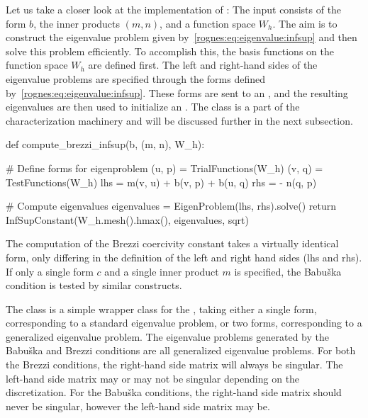 Let us take a closer look at the implementation of
: The input consists of the
form $b$, the inner products $(m, n)$, and a function space $W_h$. The
aim is to construct the eigenvalue problem given
by~\eqref{rognes:eq:eigenvalue:infsup} and then solve this problem
efficiently. To accomplish this, the basis functions on the function
space $W_h$ are defined first. The left and right-hand sides of the
eigenvalue problems are specified through the forms defined
by~\eqref{rognes:eq:eigenvalue:infsup}. These forms are sent to an
, and the resulting eigenvalues are then
used to initialize an . The
 class is a part of the
characterization machinery and will be discussed further in the next
subsection.
\begin{python}
def compute_brezzi_infsup(b, (m, n), W_h):

    # Define forms for eigenproblem
    (u, p) = TrialFunctions(W_h)
    (v, q) = TestFunctions(W_h)
    lhs = m(v, u) + b(v, p) + b(u, q)
    rhs = - n(q, p)

    # Compute eigenvalues
    eigenvalues = EigenProblem(lhs, rhs).solve()
    return InfSupConstant(W_h.mesh().hmax(), eigenvalues, sqrt)
\end{python}
The computation of the Brezzi coercivity constant takes a virtually
identical form, only differing in the definition of the left and right
hand sides (lhs and rhs). If only a single form $c$ and a single inner
product $m$ is specified, the Babu\v ska condition is tested by
similar constructs.

The  class is a simple wrapper class for the
\dolfin{} , taking either a single form,
corresponding to a standard eigenvalue problem, or two forms,
corresponding to a generalized eigenvalue problem. The eigenvalue
problems generated by the Babu\v ska and Brezzi conditions are all
generalized eigenvalue problems. For both the Brezzi conditions, the
right-hand side matrix will always be singular. The left-hand side
matrix may or may not be singular depending on the discretization. For
the Babu\v ska conditions, the right-hand side matrix should never be
singular, however the left-hand side matrix may be.

